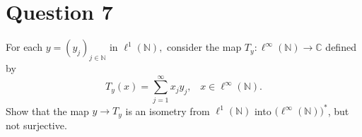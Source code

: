 \section{Question 7}
\horz
For each $y=(y_j)_{j\in\mathbb N}$ in $\ell^1(\mathbb N),$  consider the map $T_y : \ell^{\infty}(\mathbb N) \to \mathbb C$ defined by $$T_y(x) = \sum\limits_{j=1}^{\infty}x_jy_j,\,\,\,\, \,x\in \ell^{\infty}(\mathbb N).$$ Show that the map $y \to T_y$ is an isometry from $\ell^1(\mathbb N)$ into  $\big(\ell^{\infty}(\mathbb N)\big)^*$, but not surjective.
\horz
